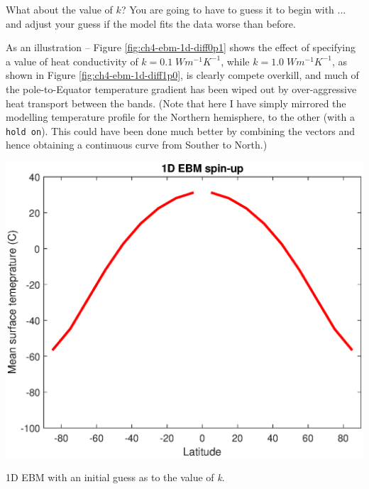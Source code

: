 \documentclass{tufte-book} %
\begin{document}
What about the value of \(k\)? You are going to have to guess it to begin with ... and adjust your guess if the model fits the data worse than before.

As an illustration -- Figure \ref{fig:ch4-ebm-1d-diff0p1} shows the effect of specifying a value of heat conductivity of \(k=0.1\;Wm^{-1}K^{-1}\), while \(k=1.0\;Wm^{-1}K^{-1}\), as shown in Figure \ref{fig:ch4-ebm-1d-diff1p0}, is clearly compete overkill, and much of the pole-to-Equator temperature gradient has been wiped out by over-aggressive heat transport between the bands. (Note that here I have simply mirrored the modelling temperature profile for the Northern hemisphere, to the other (with a \texttt{hold on}). This could have been done much better by combining the vectors and hence obtaining a continuous curve from Souther to North.)

\begin{marginfigure}[-0.0in]
\includegraphics[width=\linewidth]{ch4-ebm-1d-diff0p1.eps}
\caption{1D EBM with an initial guess as to the value of \textit{k}.}
\label{fig:ch4-ebm-1d-diff0p1}
\end{marginfigure}
\end{document}
